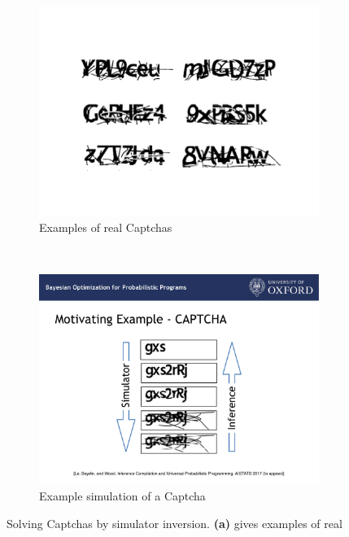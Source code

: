 \begin{figure}[t]
	\centering 
	\begin{subfigure}[t]{0.58\textwidth}
		\centering
			\includegraphics[width=\textwidth]{probprog/figures/example_captchas.pdf}
		\caption{Examples of real Captchas
			 \label{fig:probprog:example_captchas}}
	\end{subfigure}
	~~
	\begin{subfigure}[t]{0.38\textwidth}
		\centering
			\includegraphics[width=\textwidth]{probprog/figures/captcha_sim.pdf}
		\caption{Example simulation of a Captcha
			\label{fig:probprog:captcha_sim}}
	\end{subfigure}
	\vspace{5pt}
	\caption{Solving Captchas by simulator inversion.   \textbf{(a)} gives examples of real
}
\end{figure}
